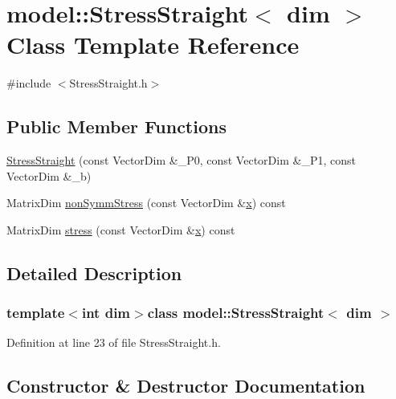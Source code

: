 \hypertarget{classmodel_1_1_stress_straight}{}\section{model\+:\+:Stress\+Straight$<$ dim $>$ Class Template Reference}
\label{classmodel_1_1_stress_straight}


{\ttfamily \#include $<$Stress\+Straight.\+h$>$}

\subsection*{Public Member Functions}
\begin{DoxyCompactItemize}
\item 
\hyperlink{classmodel_1_1_stress_straight_af38ea09d02e89e203d1383971b6c16d3}{Stress\+Straight} (const Vector\+Dim \&\+\_\+\+P0, const Vector\+Dim \&\+\_\+\+P1, const Vector\+Dim \&\+\_\+b)
\item 
Matrix\+Dim \hyperlink{classmodel_1_1_stress_straight_a8f937189fba6c4165980e569527ffd24}{non\+Symm\+Stress} (const Vector\+Dim \&\hyperlink{generate_s_t_lcyl_8m_a9336ebf25087d91c818ee6e9ec29f8c1}{x}) const 
\item 
Matrix\+Dim \hyperlink{classmodel_1_1_stress_straight_a812e0c98ae3dde18f36018ef7c3c88d3}{stress} (const Vector\+Dim \&\hyperlink{generate_s_t_lcyl_8m_a9336ebf25087d91c818ee6e9ec29f8c1}{x}) const 
\end{DoxyCompactItemize}


\subsection{Detailed Description}
\subsubsection*{template$<$int dim$>$class model\+::\+Stress\+Straight$<$ dim $>$}



Definition at line 23 of file Stress\+Straight.\+h.



\subsection{Constructor \& Destructor Documentation}
\hypertarget{classmodel_1_1_stress_straight_af38ea09d02e89e203d1383971b6c16d3}{}
